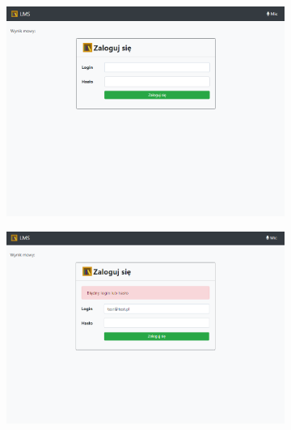 \begin{figure}[H]
    \centering
    \begin{subfigure}[b]{0.4\textwidth}
        \includegraphics[width=\textwidth]{images/login}
        \label{fig:log}
    \end{subfigure}
    \hfill
    \begin{subfigure}[b]{0.4\textwidth}
        \includegraphics[width=\textwidth]{images/badlogin}
        \label{fig:badlog}
    \end{subfigure}
    \label{fig:book-ccccc}
\end{figure}

